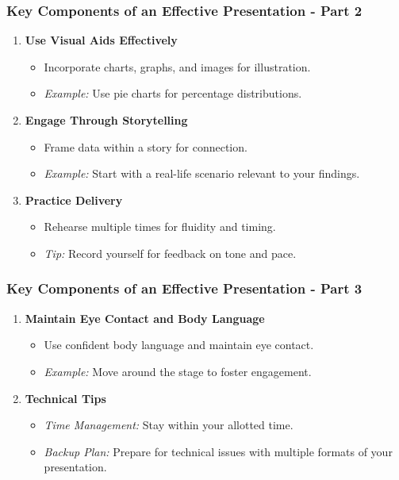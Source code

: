 \documentclass[aspectratio=169]{beamer}
\begin{document}
\begin{frame}[fragile]
    \frametitle{Key Components of an Effective Presentation - Part 2}
    \begin{enumerate}
        \item \textbf{Use Visual Aids Effectively}
        \begin{itemize}
            \item Incorporate charts, graphs, and images for illustration.
            \item \textit{Example:} Use pie charts for percentage distributions.
        \end{itemize}

        \item \textbf{Engage Through Storytelling}
        \begin{itemize}
            \item Frame data within a story for connection.
            \item \textit{Example:} Start with a real-life scenario relevant to your findings.
        \end{itemize}
        
        \item \textbf{Practice Delivery}
        \begin{itemize}
            \item Rehearse multiple times for fluidity and timing.
            \item \textit{Tip:} Record yourself for feedback on tone and pace.
        \end{itemize}
    \end{enumerate}
\end{frame}

\begin{frame}[fragile]
    \frametitle{Key Components of an Effective Presentation - Part 3}
    \begin{enumerate}
        \item \textbf{Maintain Eye Contact and Body Language}
        \begin{itemize}
            \item Use confident body language and maintain eye contact.
            \item \textit{Example:} Move around the stage to foster engagement.
        \end{itemize}

        \item \textbf{Technical Tips}
        \begin{itemize}
            \item \textit{Time Management:} Stay within your allotted time.
            \item \textit{Backup Plan:} Prepare for technical issues with multiple formats of your presentation.
        \end{itemize}
    \end{enumerate}
\end{frame}
\end{document}
